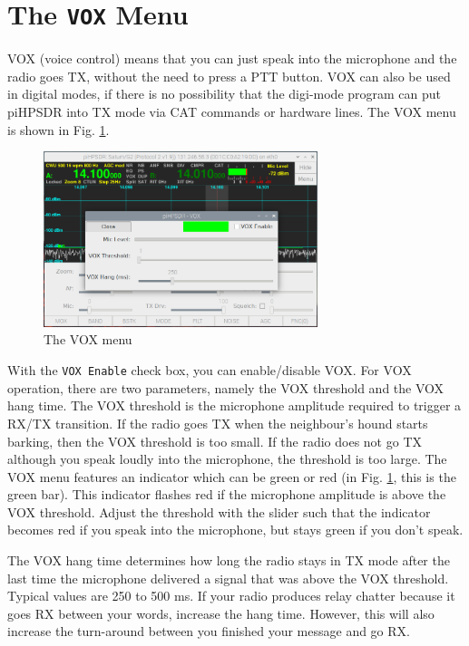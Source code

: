 \documentclass[12pt]{book}
\def\rett#1{\texttt{\color{red}#1}}
\def\pH{pi\-HPSDR }
\begin{document}
\section{The \texttt{VOX} Menu}

VOX (voice control) means that you can just speak into the microphone and the
radio goes TX, without the need to press a PTT button. VOX can also be used
in digital modes, if there is no possibility that the digi-mode program can
put \pH into TX mode via CAT commands or hardware lines. The VOX menu
is shown in Fig. \ref{fig:VOXMenu}.

\begin{figure}[ht]
\center
\includegraphics[width=8cm]{VOXMenu.png}
\caption{The VOX menu}
\label{fig:VOXMenu}
\end{figure}

With the \rett{VOX Enable} check box, you can enable/disable VOX. For VOX operation,
there are two parameters, namely the VOX threshold and the VOX hang time. The VOX threshold
is the microphone amplitude required to trigger a RX/TX transition. If the radio goes TX
when the neighbour's hound starts barking, then the VOX threshold is too small. If the radio
does not go TX  although you speak loudly into the microphone, the threshold is too large.
The VOX menu features an indicator which can be green or red (in Fig. \ref{fig:VOXMenu}, this
is the green bar). This indicator flashes red if the microphone amplitude is above the VOX
threshold. Adjust the threshold with the slider such that the indicator becomes red if  you
speak into the microphone, but stays green if you don't speak.

The VOX hang time determines how long the radio stays in TX mode after the last time the
microphone delivered a signal that was above the VOX threshold. Typical values are 250 to
500 ms. If your radio produces relay chatter because it goes RX between your words,
increase the hang time. However, this will also increase the turn-around between you finished
your message and go RX.
\end{document}
